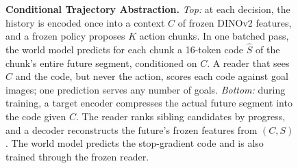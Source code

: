 \begin{figure}[t]
{}
\caption{\textbf{Conditional Trajectory Abstraction.}
\emph{Top:} at each decision, the history is encoded once into a context $C$ of frozen DINOv2 features, and a frozen policy proposes $K$ action chunks.
In one batched pass, the world model predicts for each chunk a 16-token code $\hat S$ of the chunk's entire future segment, conditioned on $C$.
A reader that sees $C$ and the code, but never the action, scores each code against goal images; one prediction serves any number of goals.
\emph{Bottom:} during training, a target encoder compresses the actual future segment into the code given $C$.
The reader ranks sibling candidates by progress, and a decoder reconstructs the future's frozen features from $(C,S)$.
The world model predicts the stop-gradient code and is also trained through the frozen reader.}
\label{fig:overview}
\end{figure}

